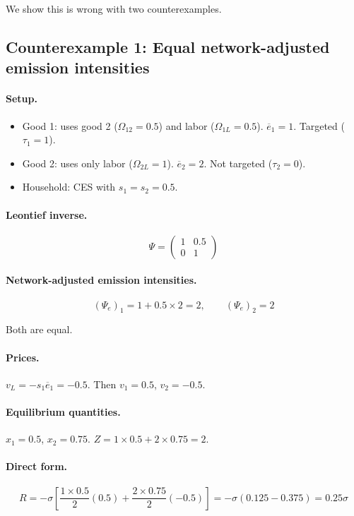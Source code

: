 \documentclass[11pt]{article}
\begin{document}
We show this is wrong with two counterexamples.

\subsection{Counterexample 1: Equal network-adjusted emission intensities}

\paragraph{Setup.}
\begin{itemize}
    \item Good 1: uses good 2 ($\Omega_{12} = 0.5$) and labor ($\Omega_{1L} = 0.5$). $\overline{e}_1 = 1$. Targeted ($\tau_1 = 1$).
    \item Good 2: uses only labor ($\Omega_{2L} = 1$). $\overline{e}_2 = 2$. Not targeted ($\tau_2 = 0$).
    \item Household: CES with $s_1 = s_2 = 0.5$.
\end{itemize}

\paragraph{Leontief inverse.}
$$\Psi = \begin{pmatrix} 1 & 0.5 \\ 0 & 1 \end{pmatrix}$$

\paragraph{Network-adjusted emission intensities.}
$$(\Psi_e)_1 = 1 + 0.5 \times 2 = 2, \qquad (\Psi_e)_2 = 2$$

Both are equal.

\paragraph{Prices.}
$v_L = -s_1\overline{e}_1 = -0.5$. Then $v_1 = 0.5$, $v_2 = -0.5$.

\paragraph{Equilibrium quantities.}
$x_1 = 0.5$, $x_2 = 0.75$. $Z = 1 \times 0.5 + 2 \times 0.75 = 2$.

\paragraph{Direct form.}
$$R = -\sigma\left[\frac{1 \times 0.5}{2}(0.5) + \frac{2 \times 0.75}{2}(-0.5)\right] = -\sigma(0.125 - 0.375) = 0.25\sigma$$
\end{document}
